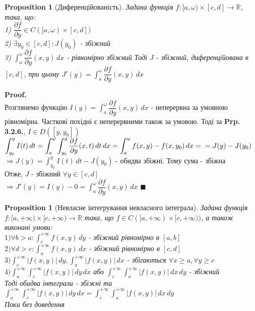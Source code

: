 \documentclass[a4paper, 14pt]{extarticle}
\def\departial#1#2{\dfrac{\partial {#1}}{\partial {#2}}}
\def\huge{\displaystyle}
\theoremstyle{theoremdd}
\theoremstyle{theoremdd}
\theoremstyle{theoremdd}
\newtheorem{proposition}[theorem]{Proposition}
\theoremstyle{theoremdd}
\theoremstyle{theoremdd}
\theoremstyle{theoremdd}
\theoremstyle{theoremdd}
\newenvironment{pf}{\vspace*{-3mm} \textbf{Proof. \\}}{$\blacksquare$}
\begin{document}
\begin{proposition}[Диференційованість]
Задана функція $f: [a,\omega) \times [c,d] \to \mathbb{R}$, така, що:\\
1) $\departial{f}{y} \in C([a,\omega) \times [c,d])$\\
2) $\exists y_0 \in [c,d]: J(y_0)$ - збіжний\\
3) $\huge \int_a^\omega \departial{f}{y}(x,y)\,dx$ - рівномірно збіжний
Тоді $J$ - збіжний, диференційована в $[c,d]$, при цьому $J'(y) = \huge \int_a^\omega \departial{f}{y}(x,y)\,dx$
\end{proposition}

\begin{pf}
Розглянемо функцію $I(y) = \huge \int_a^\omega \departial{f}{y}(x,y)\,dx$ - неперервна за умовною рівномірна. Часткові похідні є неперервними також за умовою. Тоді за \textbf{Prp. 3.2.6.}, $I \in D([y,y_0])$\\
$\huge \int_{y_0}^y I(t)\,dt = \huge \int_a^\omega \int_{y_0}^y \departial{f}{y}(x,t)\,dt\,dx = \int_a^\omega f(x,y)-f(x,y_0)\,dx = \\ = J(y) - J(y_0)$\\
$\Rightarrow J(y) = \huge \int_{y_0}^y I(t)\,dt - J(y_0)$ - обидва збіжні. Тому сума - збіжна\\
Отже, $J$ - збіжний $\forall y \in [c,d]$\\
$\Rightarrow J'(y) = I(y) - 0 = \huge \int_a^\omega \departial{f}{y}(x,y)\,dx$
\end{pf}

\begin{proposition}[Невласне інтегрування невласного інтеграла]
Задана функція $f: [a, +\infty) \times [c, +\infty) \to \mathbb{R}$ така, що $f \in C([a, +\infty) \times [c, +\infty))$, а також виконані умови:\\
$1) \forall b > a: \huge \int_c^{+\infty} f(x,y)\,dy$ - збіжний рівномірно в $[a,b]$\\
$2) \forall d > c: \huge \int_a^{+\infty} f(x,y)\,dx$ - збіжний рівномірно в $[c,d]$\\
$3) \huge \int_c^{+\infty} |f(x,y)|\,dy, \huge \int_a^{+\infty} |f(x,y)|\,dx$ - збігаються $\forall x \geq a, \forall y \geq c$\\
$4) \huge \int_a^{+\infty} \int_c^{+\infty} |f(x,y)|\,dy\,dx$ або $\huge \int_c^{+\infty} \int_a^{+\infty} |f(x,y)|\,dx\,dy$ - збіжний\\
Тоді обидва інтеграли - збіжні та \\ $\huge \int_a^{+\infty} \int_c^{+\infty} |f(x,y)|\,dy\,dx  = \huge \int_c^{+\infty} \int_a^{+\infty} |f(x,y)|\,dx\,dy$\\
\textit{Поки без доведення}
\end{proposition}
\end{document}
